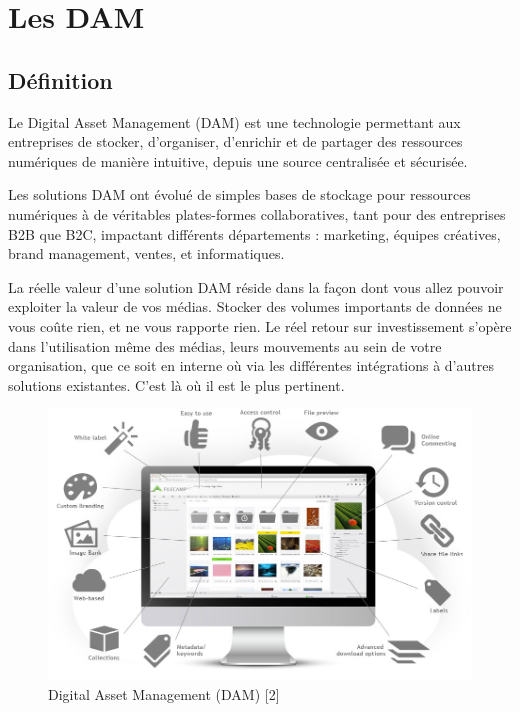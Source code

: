 \newpage
\section{Les DAM}
\subsection{Définition}{}
Le Digital Asset Management (DAM) est une technologie permettant aux entreprises de stocker, d'organiser, d'enrichir et de partager des ressources numériques de manière intuitive, depuis une source centralisée et sécurisée. 
\newline

Les solutions DAM ont évolué de simples bases de stockage pour ressources numériques à de véritables plates-formes collaboratives, tant pour des entreprises B2B que B2C, impactant différents départements : marketing, équipes créatives, brand management, ventes, et informatiques. 
\newline

La réelle valeur d'une solution DAM réside dans la façon dont vous allez pouvoir exploiter la valeur de vos médias. Stocker des volumes importants de données ne vous coûte rien, et ne vous rapporte rien. Le réel retour sur investissement s'opère dans l'utilisation même des médias, leurs mouvements au sein de votre organisation, que ce soit en interne où via les différentes intégrations à d'autres solutions existantes. C'est là où il est le plus pertinent. 
\newline

\begin{figure}[!ht]
  \centering
   \includegraphics[width=15cm]{introduction/d.png}
   \newline
   \newline
   \newline
  \caption{Digital Asset Management (DAM) [2]}
  \label{fig:test1}      
\end{figure}


